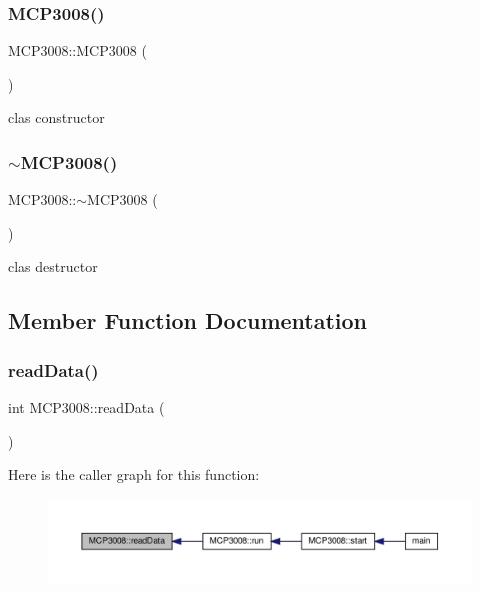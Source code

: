 \subsubsection{\texorpdfstring{M\+C\+P3008()}{MCP3008()}}
{\footnotesize\ttfamily M\+C\+P3008\+::\+M\+C\+P3008 (\begin{DoxyParamCaption}{ }\end{DoxyParamCaption})}

clas constructor \mbox{\label{classMCP3008_a96d9ef77d32f0c4efd3b942c40322aeb}} 
\subsubsection{\texorpdfstring{$\sim$\+M\+C\+P3008()}{~MCP3008()}}
{\footnotesize\ttfamily M\+C\+P3008\+::$\sim$\+M\+C\+P3008 (\begin{DoxyParamCaption}{ }\end{DoxyParamCaption})\hspace{0.3cm}{\ttfamily [inline]}}

clas destructor 

\subsection{Member Function Documentation}
\mbox{\label{classMCP3008_a583bf94e4bb38d945819914c9a2321ba}} 
\subsubsection{\texorpdfstring{read\+Data()}{readData()}}
{\footnotesize\ttfamily int M\+C\+P3008\+::read\+Data (\begin{DoxyParamCaption}{ }\end{DoxyParamCaption})\hspace{0.3cm}{\ttfamily [private]}}

Here is the caller graph for this function\+:
\nopagebreak
\begin{figure}[H]
\begin{center}
\leavevmode
\includegraphics[width=350pt]{classMCP3008_a583bf94e4bb38d945819914c9a2321ba_icgraph}
\end{center}
\end{figure}
\mbox{\label{classMCP3008_a8e243711492e50dd4327050ffae8851d}} 
